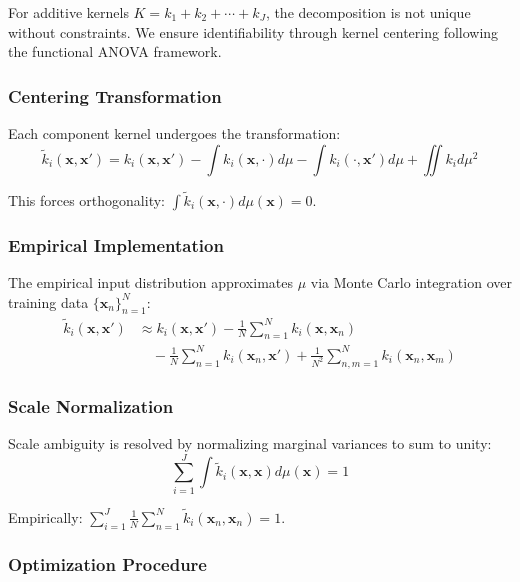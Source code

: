 \documentclass[12pt]{article}
\begin{document}
For additive kernels $K = k_1 + k_2 + \cdots + k_J$, the decomposition is not unique without constraints. We ensure identifiability through kernel centering following the functional ANOVA framework.

\subsubsection{Centering Transformation}

Each component kernel undergoes the transformation:
\begin{equation}
\tilde{k}_i(\mathbf{x},\mathbf{x}') = k_i(\mathbf{x},\mathbf{x}') - \int k_i(\mathbf{x},\cdot)d\mu - \int k_i(\cdot,\mathbf{x}')d\mu + \iint k_i d\mu^2
\end{equation}

This forces orthogonality: $\int \tilde{k}_i(\mathbf{x},\cdot)d\mu(\mathbf{x}) = 0$.

\subsubsection{Empirical Implementation}

The empirical input distribution approximates $\mu$ via Monte Carlo integration over training data $\{\mathbf{x}_n\}_{n=1}^N$:
\begin{align}
\tilde{k}_i(\mathbf{x},\mathbf{x}') &\approx k_i(\mathbf{x},\mathbf{x}') - \frac{1}{N}\sum_{n=1}^N k_i(\mathbf{x},\mathbf{x}_n) \\
&\quad - \frac{1}{N}\sum_{n=1}^N k_i(\mathbf{x}_n,\mathbf{x}') + \frac{1}{N^2}\sum_{n,m=1}^N k_i(\mathbf{x}_n,\mathbf{x}_m)
\end{align}

\subsubsection{Scale Normalization}

Scale ambiguity is resolved by normalizing marginal variances to sum to unity:
\begin{equation}
\sum_{i=1}^J \int \tilde{k}_i(\mathbf{x},\mathbf{x})d\mu(\mathbf{x}) = 1
\end{equation}

Empirically: $\sum_{i=1}^J \frac{1}{N}\sum_{n=1}^N \tilde{k}_i(\mathbf{x}_n,\mathbf{x}_n) = 1$.

\subsubsection{Optimization Procedure}
\end{document}
